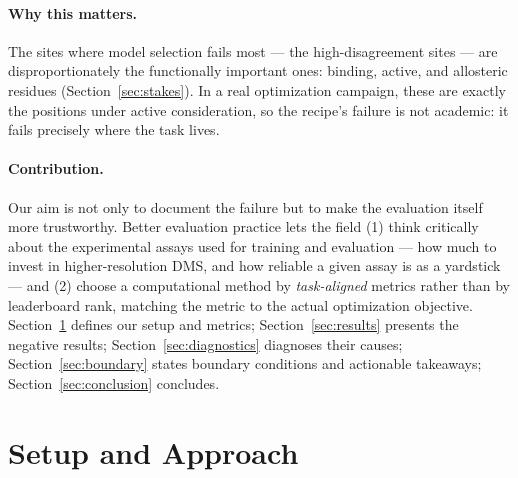 \documentclass{article}
\begin{document}
\paragraph{Why this matters.} The sites where model selection fails most --- the high-disagreement sites --- are disproportionately the functionally important ones: binding, active, and allosteric residues (Section~\ref{sec:stakes}). In a real optimization campaign, these are exactly the positions under active consideration, so the recipe's failure is not academic: it fails precisely where the task lives.

\paragraph{Contribution.} Our aim is not only to document the failure but to make the evaluation itself more trustworthy. Better evaluation practice lets the field (1) think critically about the experimental assays used for training and evaluation --- how much to invest in higher-resolution DMS, and how reliable a given assay is as a yardstick --- and (2) choose a computational method by \emph{task-aligned} metrics rather than by leaderboard rank, matching the metric to the actual optimization objective. Section~\ref{sec:setup} defines our setup and metrics; Section~\ref{sec:results} presents the negative results; Section~\ref{sec:diagnostics} diagnoses their causes; Section~\ref{sec:boundary} states boundary conditions and actionable takeaways; Section~\ref{sec:conclusion} concludes.

\section{Setup and Approach}
\label{sec:setup}
\end{document}
